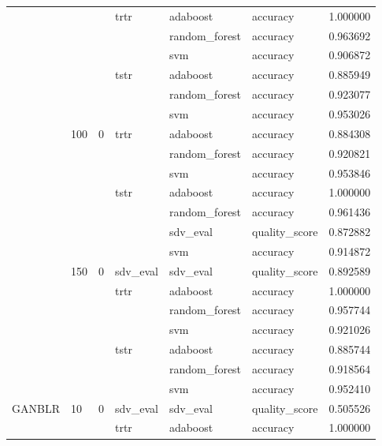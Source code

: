 \begin{longtable}{llllllr}
 &  &  & \multirow[t]{3}{*}{trtr} & adaboost & accuracy & 1.000000 \\
\cline{5-7}
 &  &  &  & random_forest & accuracy & 0.963692 \\
\cline{5-7}
 &  &  &  & svm & accuracy & 0.906872 \\
\cline{4-7} \cline{5-7}
 &  &  & \multirow[t]{3}{*}{tstr} & adaboost & accuracy & 0.885949 \\
\cline{5-7}
 &  &  &  & random_forest & accuracy & 0.923077 \\
\cline{5-7}
 &  &  &  & svm & accuracy & 0.953026 \\
\cline{2-7} \cline{3-7} \cline{4-7} \cline{5-7}
 & \multirow[t]{7}{*}{100} & \multirow[t]{7}{*}{0} & \multirow[t]{3}{*}{trtr} & adaboost & accuracy & 0.884308 \\
\cline{5-7}
 &  &  &  & random_forest & accuracy & 0.920821 \\
\cline{5-7}
 &  &  &  & svm & accuracy & 0.953846 \\
\cline{4-7} \cline{5-7}
 &  &  & \multirow[t]{4}{*}{tstr} & adaboost & accuracy & 1.000000 \\
\cline{5-7}
 &  &  &  & random_forest & accuracy & 0.961436 \\
\cline{5-7}
 &  &  &  & sdv_eval & quality_score & 0.872882 \\
\cline{5-7}
 &  &  &  & svm & accuracy & 0.914872 \\
\cline{2-7} \cline{3-7} \cline{4-7} \cline{5-7}
 & \multirow[t]{7}{*}{150} & \multirow[t]{7}{*}{0} & sdv_eval & sdv_eval & quality_score & 0.892589 \\
\cline{4-7} \cline{5-7}
 &  &  & \multirow[t]{3}{*}{trtr} & adaboost & accuracy & 1.000000 \\
\cline{5-7}
 &  &  &  & random_forest & accuracy & 0.957744 \\
\cline{5-7}
 &  &  &  & svm & accuracy & 0.921026 \\
\cline{4-7} \cline{5-7}
 &  &  & \multirow[t]{3}{*}{tstr} & adaboost & accuracy & 0.885744 \\
\cline{5-7}
 &  &  &  & random_forest & accuracy & 0.918564 \\
\cline{5-7}
 &  &  &  & svm & accuracy & 0.952410 \\
\cline{1-7} \cline{2-7} \cline{3-7} \cline{4-7} \cline{5-7}
\multirow[t]{70}{*}{GANBLR} & \multirow[t]{14}{*}{10} & \multirow[t]{7}{*}{0} & sdv_eval & sdv_eval & quality_score & 0.505526 \\
\cline{4-7} \cline{5-7}
 &  &  & \multirow[t]{3}{*}{trtr} & adaboost & accuracy & 1.000000 \\

\end{longtable}
